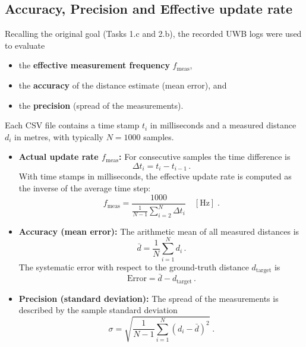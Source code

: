 \documentclass[a4paper,11pt]{article}
\begin{document}
\subsection{ Accuracy, Precision and Effective update rate}
\label{subsec:uwb-eval-metrics}

Recalling the original goal (Tasks 1.c and 2.b), the recorded UWB logs were
used to evaluate

\begin{itemize}
	\item the \textbf{effective measurement frequency} $f_{\text{meas}}$,
	\item the \textbf{accuracy} of the distance estimate (mean error), and
	\item the \textbf{precision} (spread of the measurements).
\end{itemize}

Each CSV file contains a time stamp $t_i$ in milliseconds and a measured
distance $d_i$ in metres, with typically $N = 1000$ samples.

\begin{itemize}
	\item \textbf{Actual update rate $f_{\text{meas}}$:}  
	For consecutive samples the time difference is
	\begin{equation}
		\Delta t_i = t_i - t_{i-1} \, .
	\end{equation}
	With time stamps in milliseconds, the effective update rate is computed as
	the inverse of the average time step:
	\begin{equation}
		f_{\text{meas}} = \frac{1000}{\frac{1}{N-1} \sum_{i=2}^{N} \Delta t_i}
		\quad [\text{Hz}] \; .
	\end{equation}
	
	\item \textbf{Accuracy (mean error):}  
	The arithmetic mean of all measured distances is
	\begin{equation}
		\bar{d} = \frac{1}{N} \sum_{i=1}^{N} d_i \, .
	\end{equation}
	The systematic error with respect to the ground-truth distance
	$d_{\text{target}}$ is
	\begin{equation}
		\text{Error} = \bar{d} - d_{\text{target}} \, .
	\end{equation}
	
	\item \textbf{Precision (standard deviation):}  
	The spread of the measurements is described by the sample standard deviation
	\begin{equation}
		\sigma = \sqrt{\frac{1}{N-1} \sum_{i=1}^{N} (d_i - \bar{d})^2 } \; .
	\end{equation}
\end{itemize}
\end{document}
